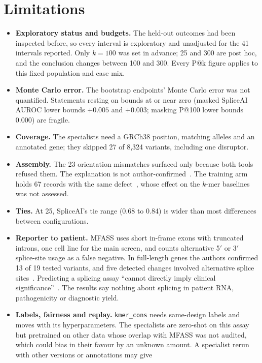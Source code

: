 \documentclass[11pt]{article}
\makeatletter
\newcommand{\cfg}[1]{\texttt{#1}}
\newcommand{\pk}[1]{P@#1}
\makeatother
\begin{document}
\section{Limitations}\label{sec:limitations}
\begin{itemize}
\item \textbf{Exploratory status and budgets.} The held-out outcomes had been inspected before, so every interval is
exploratory and unadjusted for the 41 intervals reported. Only $k=100$ was set in advance; 25 and 300 are post hoc,
and the conclusion changes between 100 and 300. Every \pk{k} figure applies to this fixed population and case mix.
\item \textbf{Monte Carlo error.} The bootstrap endpoints' Monte Carlo error was not quantified. Statements resting on
bounds at or near zero (masked SpliceAI AUROC lower bounds $+0.005$ and $+0.003$; masking \pk{100} lower bounds 0.000)
are fragile.
\item \textbf{Coverage.} The specialists need a GRCh38 position, matching alleles and an annotated gene; they skipped 27
of 8,324 variants, including one disruptor.
\item \textbf{Assembly.} The 23 orientation mismatches surfaced only because both tools refused them. The explanation is
not author-confirmed~\citep{mfass_issue1}. The training arm holds 67 records with the same defect~\citep{rb_exclusions},
whose effect on the $k$-mer baselines was not assessed.
\item \textbf{Ties.} At 25, SpliceAI's tie range (0.68 to 0.84) is wider than most differences between configurations.
\item \textbf{Reporter to patient.} MFASS uses short in-frame exons with truncated introns, one cell line for the main
screen, and counts alternative 5$'$ or 3$'$ splice-site usage as a false negative. In full-length genes the authors
confirmed 13 of 19 tested variants, and five detected changes involved alternative splice sites~\citep{chong2019mfass}.
Predicting a splicing assay ``cannot directly imply clinical significance''~\citep{mount2019cagi5}. The results say nothing
about splicing in patient RNA, pathogenicity or diagnostic yield.
\item \textbf{Labels, fairness and replay.} \cfg{kmer\_cons} needs same-design labels and moves with its hyperparameters.
The specialists are zero-shot on this assay but pretrained on other data whose overlap with MFASS was not audited,
which could bias in their favour by an unknown amount. A specialist rerun with other versions or annotations may give

\end{itemize}
\end{document}
